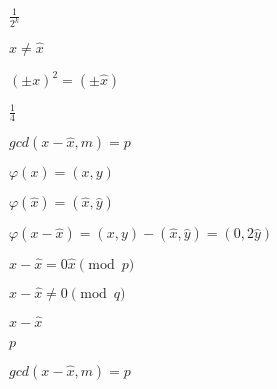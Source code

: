 \documentclass[10pt]{book}
\begin{document}
\begin{mdSnippets}
\begin{mdInlineSnippet}[3d9ae6d78cecffb391ef7928094b8d97]
$\frac{1}{2^k}$\end{mdInlineSnippet}%
\begin{mdInlineSnippet}[07ad31d2b7c7230672acb4ea76fc8ad5]%
$x \neq \hat{x}$\end{mdInlineSnippet}%
\begin{mdInlineSnippet}[1dd2eaea317b1ee3c992899ca7a01cb1]%
$(\pm x)^2 = (\pm \hat{x})$\end{mdInlineSnippet}%
\begin{mdInlineSnippet}[eca3bf81573307ec3002cf846390d363]%
$\frac{1}{4}$\end{mdInlineSnippet}%
\begin{mdInlineSnippet}[2f9f317072d221079d124cfe5c6f2af9]%
$gcd(x - \hat{x},m) = p$\end{mdInlineSnippet}%
\begin{mdInlineSnippet}[3b67669de481e6a872ecc05f901b17bd]%
$\varphi(x) = (x,y)$\end{mdInlineSnippet}%
\begin{mdInlineSnippet}[5f7e4bec038b9c9e6621e4f53cb13478]%
$\varphi(\hat{x}) = (\hat{x},\hat{y})$\end{mdInlineSnippet}%
\begin{mdInlineSnippet}[e975db04f2787ff246f771a1215760c6]%
$\varphi(x - \hat{x}) = (x,y) - (\hat{x},\hat{y}) = (0,2\hat{y})$\end{mdInlineSnippet}%
\begin{mdInlineSnippet}%
$x-\hat{x} = 0 \hat{x} \pmod{p}$\end{mdInlineSnippet}%
\begin{mdInlineSnippet}%
$x - \hat{x} \neq 0 \pmod{q}$\end{mdInlineSnippet}%
\begin{mdInlineSnippet}%
$x - \hat{x}$\end{mdInlineSnippet}%
\begin{mdInlineSnippet}[83878c91171338902e0fe0fb97a8c47a]%
$p$\end{mdInlineSnippet}%
\begin{mdInlineSnippet}[39b87c97ae33a3a6ce626012ca120f78]%
$gcd(x - \hat{x}, m) = p$\end{mdInlineSnippet}%

\end{mdSnippets}
\end{document}
